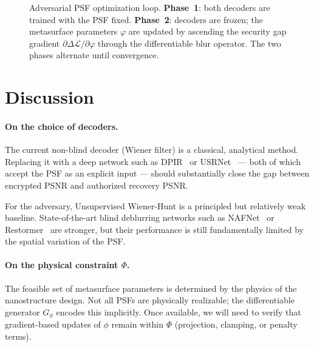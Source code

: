 \documentclass[11pt, a4paper]{article}
\begin{document}
\begin{figure}[H]
\begin{tikzpicture}
\end{tikzpicture}
\caption{Adversarial PSF optimization loop.
         \textbf{Phase~1}: both decoders are trained with the PSF fixed.
         \textbf{Phase~2}: decoders are frozen; the metasurface parameters
         $\varphi$ are updated by ascending the security gap gradient
         $\partial\Delta\mathcal{L}/\partial\varphi$ through the differentiable
         blur operator.  The two phases alternate until convergence.}
\label{fig:pipeline}
\end{figure}

\section{Discussion}
\label{sec:discussion}

\paragraph{On the choice of decoders.}
The current non-blind decoder (Wiener filter) is a classical, analytical
method.  Replacing it with a deep network such as
DPIR~\cite{zhang2021dpir} or USRNet~\cite{zhang2020usrnet} — both of which
accept the PSF as an explicit input — should substantially close the gap
between encrypted PSNR and authorized recovery PSNR.

For the adversary, Unsupervised Wiener-Hunt is a principled but relatively
weak baseline.  State-of-the-art blind deblurring networks such as
NAFNet~\cite{chen2022nafnet} or Restormer~\cite{zamir2022restormer} are
stronger, but their performance is still fundamentally limited by the spatial
variation of the PSF.

\paragraph{On the physical constraint $\Phi$.}
The feasible set of metasurface parameters is determined by the physics of the
nanostructure design.  Not all PSFs are physically realizable; the
differentiable generator $G_\phi$ encodes this implicitly.  Once available,
we will need to verify that gradient-based updates of $\phi$ remain within
$\Phi$ (projection, clamping, or penalty terms).
\end{document}
